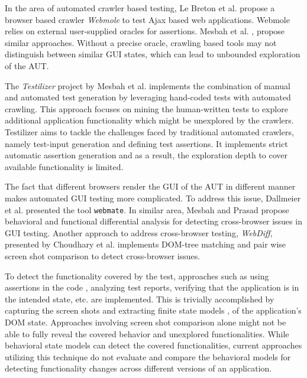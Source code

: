 In the area of automated crawler based testing, Le Breton et al. \cite{le2013automated} propose a browser based crawler \textit{Webmole} to test Ajax based web applications. Webmole relies on external user-supplied oracles for assertions. Mesbah et al. \cite{Crawljax}, \cite{MesbahInvarient} propose similar approaches. Without a precise oracle, crawling based tools may not distinguish between similar GUI states, which can lead to unbounded exploration of the AUT.

The \textit{Testilizer} project by Mesbah et al. \cite{testilizer} implements the combination of manual and automated test generation by leveraging hand-coded tests with automated crawling. This approach focuses on mining the human-written tests to explore additional application functionality which might be unexplored by the crawlers. Testilizer aims to tackle the challenges faced by traditional automated crawlers, namely test-input generation and defining test assertions. It implements strict automatic assertion generation and as a result, the exploration depth to cover available functionality is limited.
 
The fact that different browsers render the GUI of the AUT in different manner makes automated GUI testing more complicated. To address this issue, Dallmeier et al. \cite{webmate} presented the tool \texttt{webmate}. In similar area, Mesbah and Prasad \cite{CBCMesbah} propose behavioral and functional differential analysis for detecting cross-browser issues in GUI testing. Another approach to address cross-browser testing, \textit{WebDiff}, presented by Choudhary et al. \cite{WebDiff} implements DOM-tree matching and pair wise screen shot comparison to detect cross-browser issues. 

To detect the functionality covered by the test, approaches such as using assertions in the code \cite{voas1997assertions}, analyzing test reports, verifying that the application is in the intended state, etc. are implemented. This is trivially accomplished by capturing the screen shots \cite{GUIdiffBauersfeld} and extracting finite state models \cite{marchettoStateBased}, \cite{SchurMiningBehavModels} of the application's DOM state. Approaches involving screen shot comparison alone might not be able to fully reveal the covered behavior and unexplored functionalities. While behavioral state models can detect the covered functionalities, current approaches utilizing this technique do not evaluate and compare the behavioral models for detecting functionality changes across different versions of an application. 

